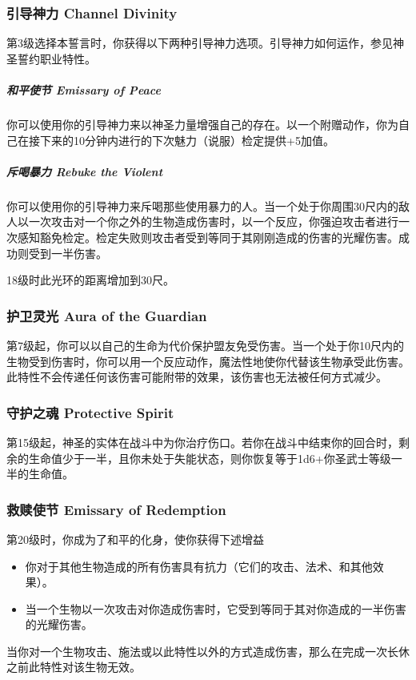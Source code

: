 \subsubsection{引导神力 Channel Divinity}第3级选择本誓言时，你获得以下两种引导神力选项。引导神力如何运作，参见神圣誓约职业特性。
\subparagraph{和平使节 Emissary of Peace}你可以使用你的引导神力来以神圣力量增强自己的存在。以一个附赠动作，你为自己在接下来的10分钟内进行的下次魅力（说服）检定提供+5加值。
\subparagraph{斥喝暴力 Rebuke the Violent}你可以使用你的引导神力来斥喝那些使用暴力的人。当一个处于你周围30尺内的敌人以一次攻击对一个你之外的生物造成伤害时，以一个反应，你强迫攻击者进行一次感知豁免检定。检定失败则攻击者受到等同于其刚刚造成的伤害的光耀伤害。成功则受到一半伤害。

18级时此光环的距离增加到30尺。

\subsubsection{护卫灵光 Aura of the Guardian}第7级起，你可以以自己的生命为代价保护盟友免受伤害。当一个处于你10尺内的生物受到伤害时，你可以用一个反应动作，魔法性地使你代替该生物承受此伤害。此特性不会传递任何该伤害可能附带的效果，该伤害也无法被任何方式减少。

\subsubsection{守护之魂 Protective Spirit}第15级起，神圣的实体在战斗中为你治疗伤口。若你在战斗中结束你的回合时，剩余的生命值少于一半，且你未处于失能状态，则你恢复等于1d6+你圣武士等级一半的生命值。

\subsubsection{救赎使节 Emissary of Redemption}第20级时，你成为了和平的化身，使你获得下述增益
\begin{itemize}
\item 你对于其他生物造成的所有伤害具有抗力（它们的攻击、法术、和其他效果）。
\item 当一个生物以一次攻击对你造成伤害时，它受到等同于其对你造成的一半伤害的光耀伤害。
\end{itemize}

当你对一个生物攻击、施法或以此特性以外的方式造成伤害，那么在完成一次长休之前此特性对该生物无效。

